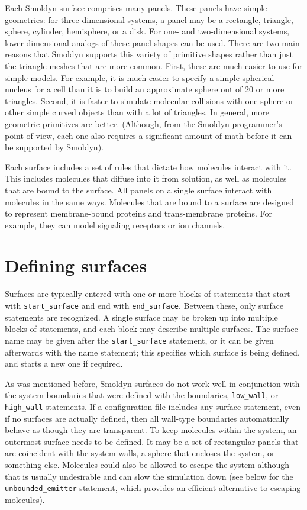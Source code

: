 \documentclass {scrbook}
\newcommand {\ttt} {\texttt}
\begin{document}
Each Smoldyn surface comprises many panels. These panels have simple geometries: for three-dimensional systems, a panel may be a rectangle, triangle, sphere, cylinder, hemisphere, or a disk. For one- and two-dimensional systems, lower dimensional analogs of these panel shapes can be used. There are two main reasons that Smoldyn supports this variety of primitive shapes rather than just the triangle meshes that are more common. First, these are much easier to use for simple models. For example, it is much easier to specify a simple spherical nucleus for a cell than it is to build an approximate sphere out of 20 or more triangles. Second, it is faster to simulate molecular collisions with one sphere or other simple curved objects than with a lot of triangles. In general, more geometric primitives are better. (Although, from the Smoldyn programmer's point of view, each one also requires a significant amount of math before it can be supported by Smoldyn).

Each surface includes a set of rules that dictate how molecules interact with it. This includes molecules that diffuse into it from solution, as well as molecules that are bound to the surface. All panels on a single surface interact with molecules in the same ways. Molecules that are bound to a surface are designed to represent membrane-bound proteins and trans-membrane proteins. For example, they can model signaling receptors or ion channels.

\section{Defining surfaces}

Surfaces are typically entered with one or more blocks of statements that start with \ttt{start\_surface} and end with \ttt{end\_surface}. Between these, only surface statements are recognized. A single surface may be broken up into multiple blocks of statements, and each block may describe multiple surfaces. The surface name may be given after the \ttt{start\_surface} statement, or it can be given afterwards with the name statement; this specifies which surface is being defined, and starts a new one if required.

As was mentioned before, Smoldyn surfaces do not work well in conjunction with the system boundaries that were defined with the boundaries, \ttt{low\_wall}, or \ttt{high\_wall} statements. If a configuration file includes any surface statement, even if no surfaces are actually defined, then all wall-type boundaries automatically behave as though they are transparent. To keep molecules within the system, an outermost surface needs to be defined. It may be a set of rectangular panels that are coincident with the system walls, a sphere that encloses the system, or something else. Molecules could also be allowed to escape the system although that is usually undesirable and can slow the simulation down (see below for the \ttt{unbounded\_emitter} statement, which provides an efficient alternative to escaping molecules).
\end{document}
